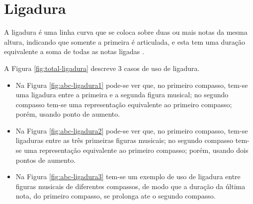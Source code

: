 
\section{Ligadura}
\label{sec:ligadura}

A ligadura é uma linha curva que se coloca sobre duas ou mais notas da mesma altura, 
indicando que somente a primeira é articulada, 
e esta tem uma duração equivalente a soma de todas as notas ligadas \cite[pp. 35]{cardoso1973curso}.

\begin{example}
A Figura \ref{fig:total-ligadura} descreve 3 casos de uso de ligadura.
\begin{itemize}
\item Na Figura \ref{fig:abc-ligadura1} pode-se ver que, no primeiro compasso, 
tem-se uma ligadura entre a primeira e a segunda figura musical; 
no segundo compasso tem-se uma representação equivalente ao primeiro compasso; 
porém, usando ponto de aumento.
\item Na Figura \ref{fig:abc-ligadura2} pode-se ver que, no primeiro compasso, 
tem-se ligaduras entre as três primeiras figuras musicais; 
no segundo compasso tem-se uma representação equivalente ao primeiro compasso; 
porém, usando dois pontos de aumento.
\item Na Figura \ref{fig:abc-ligadura3} tem-se um exemplo de uso de ligadura entre figuras musicais de diferentes compassos,
de modo que a duração da última nota, do primeiro compasso, se prolonga ate o segundo compasso.
\end{itemize}
\end{example}


